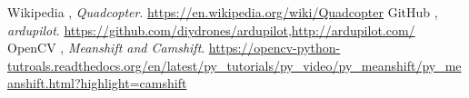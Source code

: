 \begin{thebibliography}{9}

  Wikipedia ,
  \emph{Quadcopter}.
  \url{https://en.wikipedia.org/wiki/Quadcopter}
  GitHub ,
  \emph{ardupilot}.
  \url{https://github.com/diydrones/ardupilot},\url{http://ardupilot.com/}
  OpenCV ,
  \emph{Meanshift and Camshift}.
  \url{https://opencv-python-tutroals.readthedocs.org/en/latest/py_tutorials/py_video/py_meanshift/py_meanshift.html?highlight=camshift}
\end{thebibliography}
